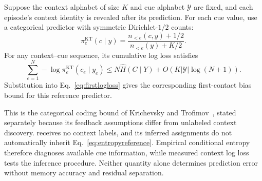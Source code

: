 \begin{corollary}\label{cor:entropy}
Suppose the context alphabet of size $K$ and cue alphabet $\mathcal Y$ are fixed, and each episode's context identity is revealed after its prediction. For each cue value, use a categorical predictor with symmetric Dirichlet-$1/2$ counts:
\[
 \pi_e^{\mathrm{KT}}(c\mid y)=
 \frac{n_{<e}(c,y)+1/2}{n_{<e}(y)+K/2}.
\]
For any context--cue sequence, its cumulative log loss satisfies
\begin{equation}\label{eq:entropyreference}
 \sum_{e=1}^N-\log\pi_e^{\mathrm{KT}}(c_e\mid y_e)
 \leq N\widehat H(C\mid Y)+O\!\left(K|\mathcal Y|\log(N+1)\right).
\end{equation}
Substitution into Eq.~\eqref{eq:firstlogloss} gives the corresponding first-contact bias bound for this reference predictor.
\end{corollary}
This is the categorical coding bound of Krichevsky and Trofimov~\citep{krichevsky1981performance}, stated separately because its feedback assumptions differ from unlabeled context discovery. \method{} receives no context labels, and its inferred assignments do not automatically inherit Eq.~\eqref{eq:entropyreference}. Empirical conditional entropy therefore diagnoses available cue information, while measured context log loss tests the inference procedure. Neither quantity alone determines prediction error without memory accuracy and residual separation.

